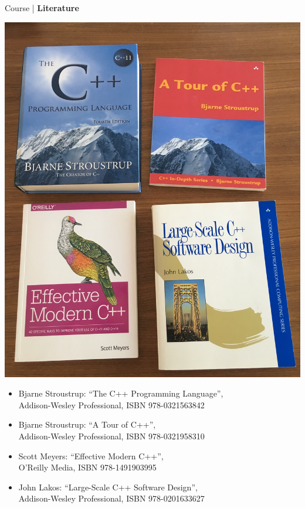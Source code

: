 \begin{frame}{Course | \textbf{Literature}}
    
    {
        \includegraphics[width=\textwidth]{images/buecher}
    }
    {
    	\begin{itemize}
            \item Bjarne Stroustrup: \enquote{The C++ Programming Language},\\Addison-Wesley Professional, ISBN 978-0321563842
            \medskip
            \item Bjarne Stroustrup: \enquote{A Tour of C++},\\Addison-Wesley Professional, ISBN 978-0321958310
            \medskip
            \item Scott Meyers: \enquote{Effective Modern C++},\\O'Reilly Media, ISBN 978-1491903995
            \medskip
            \item John Lakos: \enquote{Large-Scale C++ Software Design},\\Addison-Wesley Professional, ISBN 978-0201633627
        \end{itemize}
    }

\end{frame}


